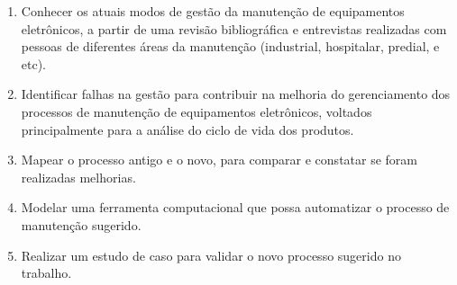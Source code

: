 \begin{enumerate}
	\item Conhecer os atuais modos de gestão da manutenção de equipamentos eletrônicos, a partir de uma revisão bibliográfica e entrevistas realizadas com pessoas de diferentes áreas da manutenção (industrial, hospitalar, predial, e etc).
	\item Identificar falhas na gestão para contribuir na melhoria do gerenciamento dos processos de manutenção de equipamentos eletrônicos, voltados principalmente para a análise do ciclo de vida dos produtos.
	\item Mapear o processo antigo e o novo, para comparar e constatar se foram realizadas melhorias.
	\item Modelar uma ferramenta computacional que possa automatizar o processo de manutenção sugerido.
	\item Realizar um estudo de caso para validar o novo processo sugerido no trabalho.
\end{enumerate}

%







